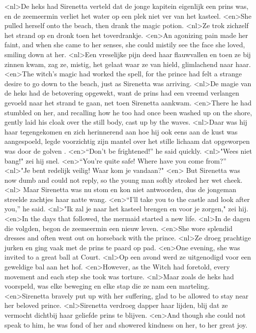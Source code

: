 <nl>De heks had Sirenetta verteld dat de jonge kapitein eigenlijk een prins was, en de zeemeermin verliet het water op een plek niet ver van het kasteel.
<en>She pulled herself onto the beach, then drank the magic potion.
<nl>Ze trok zichzelf het strand op en dronk toen het toverdrankje.
<en>An agonizing pain made her faint, and when she came to her senses, she could mistily see the face she loved, smiling down at her.
<nl>Een vreselijke pijn deed haar flauwvallen en toen ze bij zinnen kwam, zag ze, mistig, het gelaat waar ze van hield, glimlachend naar haar.
<en>The witch’s magic had worked the spell, for the prince had felt a strange desire to go down to the beach, just as Sirenetta was arriving.
<nl>De magie van de heks had de betovering opgewekt, want de prins had een vreemd verlangen gevoeld naar het strand te gaan, net toen Sirenetta aankwam.
<en>There he had stumbled on her, and recalling how he too had once been washed up on the shore, gently laid his cloak over the still body, cast up by the waves.
<nl>Daar was hij haar tegengekomen en zich herinnerend aan hoe hij ook eens aan de kust was aangespoeld, legde voorzichtig zijn mantel over het stille lichaam dat  opgeworpen was door de golven .
<en>“Don’t be frightened!” he said quickly.
<nl>"Wees niet bang!" zei hij snel.
<en>“You’re quite safe! Where have you come from?”
<nl>"Je bent redelijk veilig! Waar kom je vandaan?"
<en> But Sirenetta was now dumb and could not reply, so the young man softly stroked her wet cheek.
<nl> Maar Sirenetta was nu stom en kon niet antwoorden, dus de jongeman streelde zachtjes haar natte wang.
<en>“I’ll take you to the castle and look after you,” he said.
<nl>"Ik zal je naar het kasteel brengen en voor je zorgen," zei hij.
<en>In the days that followed, the mermaid started a new life.
<nl>In de dagen die volgden, begon de zeemeermin een nieuw leven.
<en>She wore splendid dresses and often went out on horseback with the prince.
<nl>Ze droeg prachtige jurken en ging vaak met de prins te paard op pad.
<en>One evening, she was invited to a great ball at Court.
<nl>Op een avond werd ze uitgenodigd voor een geweldige bal aan het hof.
<en>However, as the Witch had foretold, every movement and each step she took was torture.
<nl>Maar zoals de heks had voorspeld, was elke beweging en elke stap die ze nam een marteling.
<en>Sirenetta bravely put up with her suffering, glad to be allowed to stay near her beloved prince.
<nl>Sirenetta verdroeg dapper haar lijden, blij dat ze vermocht dichtbij haar geliefde prins te blijven.
<en>And though she could not speak to him, he was fond of her and showered kindness on her, to her great joy.
